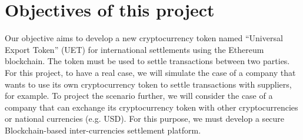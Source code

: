 \section{Objectives of this project}

Our objective aims to develop a new cryptocurrency token named “Universal Export Token” (UET) for international settlements using the Ethereum blockchain. The token must be used to settle transactions
between two parties. For this project, to have a real case, we will simulate the case of a company that wants to use its own cryptocurrency token to settle transactions with suppliers, for example.
To project the scenario further, we will consider the case of a company that can exchange its cryptocurrency token with other cryptocurrencies or national currencies (e.g. USD). For this purpose, we must develop a secure Blockchain-based inter-currencies settlement
platform.
